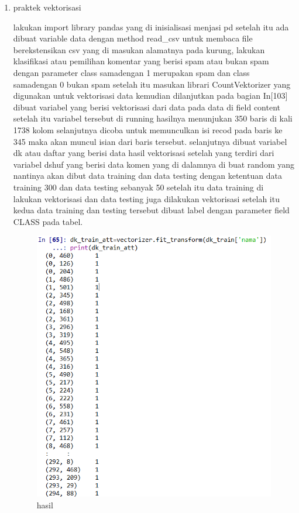 \begin{enumerate}
\item praktek vektorisasi
	
\par lakukan import library pandas yang di inisialisasi menjasi pd setelah itu ada dibuat variable data dengan method read\_csv untuk membaca file berekstensikan csv yang di masukan alamatnya pada kurung, lakukan klasifikasi atau pemilihan komentar yang berisi spam atau bukan spam dengan parameter class samadengan 1 merupakan spam dan class samadengan 0 bukan spam setelah itu masukan librari CountVektorizer yang digunakan untuk vektorisasi data kemudian dilanjutkan pada bagian In[103] dibuat variabel yang berisi vektorisasi dari data pada data di field content setelah itu variabel tersebut di running hasilnya menunjukan 350 baris di kali 1738 kolom selanjutnya dicoba untuk memunculkan isi recod pada baris ke 345 maka akan muncul isian dari baris tersebut. selanjutnya dibuat variabel dk atau daftar yang berisi data hasil vektorisasi setelah yang terdiri dari variabel dshuf yang berisi data komen yang di dalamnya di buat random yang nantinya akan dibut data training dan data testing dengan ketentuan data training 300 dan data testing sebanyak 50 setelah itu data training di lakukan vektorisasi dan data testing juga dilakukan vektorisasi setelah itu kedua data training dan testing tersebut dibuat label dengan parameter field CLASS pada tabel.
\begin{figure}[H]
\centering
\includegraphics[scale=0.7]{figures/1174031/4/8.PNG}
\caption{hasil}
\label{Praktek no 3}
\end{figure}		


\end{enumerate}
